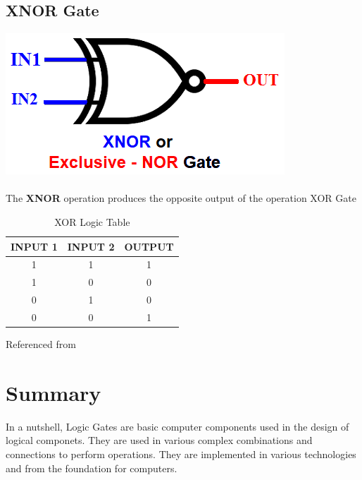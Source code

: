 \documentclass{article}
\begin{document}
\newpage
\subsection{XNOR Gate}
\includegraphics[width=0.8\linewidth]{xnor}
\paragraph{}
The \textbf{XNOR} operation produces the opposite output of the operation XOR Gate
\begin{table}[h]
	\centering
	\label{tab:table7}
	\caption{XOR Logic Table}
	\begin{tabular}{|c|c|c|}
		INPUT 1 & INPUT 2 & OUTPUT\\
		\hline
		1&1&1\\
		1&0&0\\
		0&1&0\\
		0&0&1\\
	\end{tabular}
\end{table}
Referenced from~\cite{okoacha2021logicgatestype2}
\newpage
\section{Summary}

In a nutshell, Logic Gates are basic computer components used in the design of logical componets. They are used in various complex combinations and connections to perform operations. They are implemented in various technologies and from the foundation for computers.

\newpage



\end{document}
